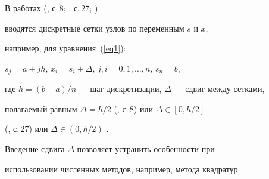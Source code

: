 \begin{alg}


В работах (\cite{bl}, с.\,8; \cite{gab}, с.\,27; \cite{bk})


вводятся дискретные сетки узлов по переменным $s$ и $x$,


например, для уравнения~(\ref{eq1}):


$s_j=a+jh$, $x_i=s_i+\Delta$, $j,i=0,1,\dotsc,n$, $s_n=b$,


где $h=(b-a)/n$ --- шаг дискретизации, $\Delta$ --- сдвиг между сетками,


полагаемый равным $\Delta=h/2$ (\cite{bl}, с.\,8) или $\Delta\in[0,h/2]$


(\cite{gab}, с.\,27) или $\Delta\in(0,h/2)$ \cite{bk}.


Введение сдвига $\Delta$ позволяет устранить особенности при


использовании численных методов, например, метода квадратур.


\end{alg}





